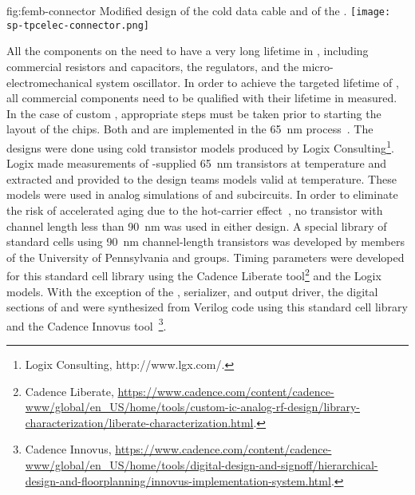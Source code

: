 \begin{dunefigure}
{fig:femb-connector}
{Modified design of the cold data cable and of the  .}
\texttt{[image: sp-tpcelec-connector.png]}
\end{dunefigure}

All the components on the  need to have a very long lifetime
in , including commercial resistors and capacitors, the
 regulators, and the micro-electromechanical system oscillator.
In order to achieve the targeted lifetime of \dunelifetime{}, all commercial components 
need to be qualified with %
their lifetime in  %
measured. 
In the case of custom , appropriate steps must be taken prior 
to starting the layout of the chips. Both  and 
 are implemented in the  \SI{65}{nm}  
process~\cite{TSMC65}. The designs were done using cold transistor models 
produced by Logix Consulting\footnote{Logix\texttrademark{} Consulting, http://www.lgx.com/.}.  Logix made measurements of 
-supplied  \SI{65}{nm} transistors at \lntwo 
temperature and extracted and provided to the design teams  
models valid at \lntwo temperature.  These models were used in 
analog simulations of  and  subcircuits.  
In order to eliminate the risk of accelerated aging due to the hot-carrier
effect~\cite{Hot-electron}, no transistor with channel length
less than \SI{90}{nm} was used in either  design.
A special library of standard cells using \SI{90}{nm} channel-length 
transistors was developed by members of the University
of Pennsylvania and  groups. Timing parameters were
developed for this standard cell library using the Cadence Liberate
tool\footnote{Cadence Liberate\texttrademark{}, \url{https://www.cadence.com/content/cadence-www/global/en_US/home/tools/custom-ic-analog-rf-design/library-characterization/liberate-characterization.html}. } 
and the Logix ~\cite{spice} models. With the
exception of the  , serializer, and
output driver, the digital sections of  and
 were synthesized from Verilog code using this
standard cell library and the Cadence Innovus tool~\footnote{Cadence Innovus\texttrademark{}, \url{https://www.cadence.com/content/cadence-www/global/en_US/home/tools/digital-design-and-signoff/hierarchical-design-and-floorplanning/innovus-implementation-system.html}.}. 
